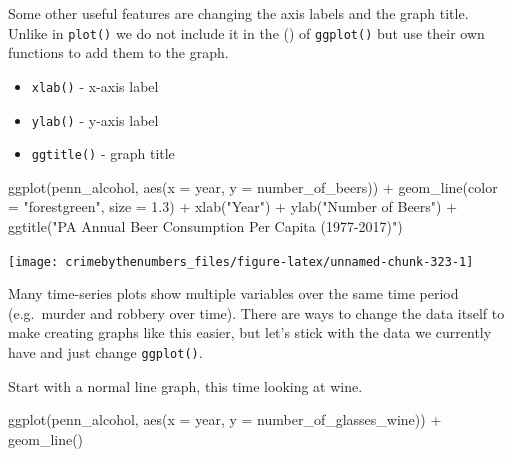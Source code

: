 \documentclass[
]{krantz}
\makeatletter
\newenvironment{Shaded}{\begin{snugshade}}{\end{snugshade}}
\newcommand{\AttributeTok}[1]{\textcolor[rgb]{0.61,0.61,0.61}{#1}}
\newcommand{\FloatTok}[1]{\textcolor[rgb]{0.06,0.06,0.06}{#1}}
\newcommand{\FunctionTok}[1]{\textcolor[rgb]{0,0,0}{#1}}
\newcommand{\NormalTok}[1]{#1}
\newcommand{\SpecialCharTok}[1]{\textcolor[rgb]{0,0,0}{#1}}
\newcommand{\StringTok}[1]{\textcolor[rgb]{0.5,0.5,0.5}{#1}}
\providecommand{\tightlist}{%
  \setlength{\itemsep}{0pt}\setlength{\parskip}{0pt}}
\newenvironment{kframe}{%
\medskip{}
\setlength{\fboxsep}{.8em}
 \def\at@end@of@kframe{}%
 \ifinner\ifhmode%
  \def\at@end@of@kframe{\end{minipage}}%
  \begin{minipage}{\columnwidth}%
 \fi\fi%
 \def\FrameCommand##1{\hskip\@totalleftmargin \hskip-\fboxsep
 \colorbox{shadecolor}{##1}\hskip-\fboxsep
     \hskip-\linewidth \hskip-\@totalleftmargin \hskip\columnwidth}%
 \MakeFramed {\advance\hsize-\width
   \@totalleftmargin\z@ \linewidth\hsize
   \@setminipage}}%
 {\par\unskip\endMakeFramed%
 \at@end@of@kframe}
\renewenvironment{Shaded}{\begin{kframe}}{\end{kframe}}
\makeatother
\begin{document}
Some other useful features are changing the axis labels and the graph title. Unlike in \texttt{plot()} we do not include it in the () of \texttt{ggplot()} but use their own functions to add them to the graph.

\begin{itemize}
\tightlist
\item
  \texttt{xlab()} - x-axis label
\item
  \texttt{ylab()} - y-axis label
\item
  \texttt{ggtitle()} - graph title
\end{itemize}

\begin{Shaded}
\begin{Highlighting}[]
\FunctionTok{ggplot}\NormalTok{(penn\_alcohol, }\FunctionTok{aes}\NormalTok{(}\AttributeTok{x =}\NormalTok{ year, }\AttributeTok{y =}\NormalTok{ number\_of\_beers)) }\SpecialCharTok{+}
  \FunctionTok{geom\_line}\NormalTok{(}\AttributeTok{color =} \StringTok{"forestgreen"}\NormalTok{, }\AttributeTok{size =} \FloatTok{1.3}\NormalTok{) }\SpecialCharTok{+}
  \FunctionTok{xlab}\NormalTok{(}\StringTok{"Year"}\NormalTok{) }\SpecialCharTok{+}
  \FunctionTok{ylab}\NormalTok{(}\StringTok{"Number of Beers"}\NormalTok{) }\SpecialCharTok{+}
  \FunctionTok{ggtitle}\NormalTok{(}\StringTok{"PA Annual Beer Consumption Per Capita (1977{-}2017)"}\NormalTok{)}
\end{Highlighting}
\end{Shaded}

\begin{center}\texttt{[image: crimebythenumbers\_files/figure-latex/unnamed-chunk-323-1]} \end{center}

Many time-series plots show multiple variables over the same time period (e.g.~murder and robbery over time). There are ways to change the data itself to make creating graphs like this easier, but let's stick with the data we currently have and just change \texttt{ggplot()}.

Start with a normal line graph, this time looking at wine.

\begin{Shaded}
\begin{Highlighting}[]
\FunctionTok{ggplot}\NormalTok{(penn\_alcohol, }\FunctionTok{aes}\NormalTok{(}\AttributeTok{x =}\NormalTok{ year, }\AttributeTok{y =}\NormalTok{ number\_of\_glasses\_wine)) }\SpecialCharTok{+}
  \FunctionTok{geom\_line}\NormalTok{()}
\end{Highlighting}
\end{Shaded}
\end{document}
